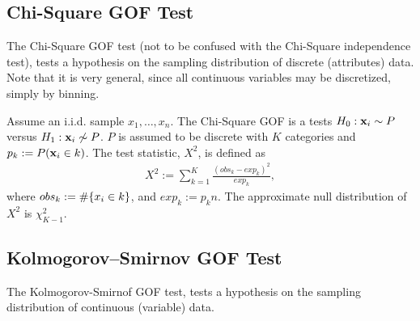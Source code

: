 \subsection{Chi-Square GOF Test}
The Chi-Square GOF test (not to be confused with the Chi-Square independence test), tests a hypothesis on the sampling distribution of discrete (attributes) data. 
Note that it is very general, since all continuous variables may be discretized, simply by binning.

\begin{definition}
Assume an i.i.d. sample $x_1,\dots,x_n$. 
The Chi-Square GOF is a tests $H_0: \mathbf{x}_i \sim P$ versus $H_1: \mathbf{x}_i \not\sim P$.
$P$ is assumed to be discrete with $K$ categories and $p_k:= P(\mathbf{x}_i \in k)$.
The test statistic, $X^2$, is defined as
\begin{align}
	X^2:= \sum_{k=1}^{K}\frac{(obs_k-exp_k)^2}{exp_k}, 
\end{align}
where $obs_k:= \#\{ x_i \in k \}$, and $exp_k:= p_k n$.
The approximate null distribution of $X^2$ is $\chi^2_{K-1}$.
\end{definition} 



\subsection{Kolmogorov–Smirnov GOF Test}
The Kolmogorov-Smirnof GOF test, tests a hypothesis on the sampling distribution of continuous (variable) data. 

